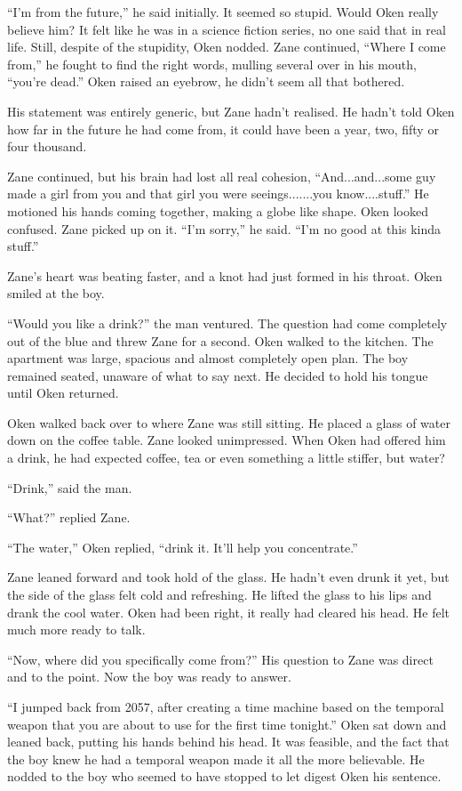 ``I'm from the future,'' he said initially.  It seemed so stupid.  Would Oken really believe him?  It felt like he was in a science fiction series, no one said that in real life.  Still, despite of the stupidity, Oken nodded.  Zane continued, ``Where I come from,'' he fought to find the right words, mulling several over in his mouth, ``you're dead.''  Oken raised an eyebrow, he didn't seem all that bothered.

His statement was entirely generic, but Zane hadn't realised.  He hadn't told Oken how far in the future he had come from, it could have been a year, two, fifty or four thousand.  

Zane continued, but his brain had lost all real cohesion, ``And...and...some guy made a girl from you and that girl you were seeings.......you know....stuff.''  He motioned his hands coming together, making a globe like shape.  Oken looked confused.  Zane picked up on it.  ``I'm sorry,'' he said.  ``I'm no good at this kinda stuff.''

Zane's heart was beating faster, and a knot had just formed in his throat.  Oken smiled at the boy.  

``Would you like a drink?'' the man ventured.  The question had come completely out of the blue and threw Zane for a second.  Oken walked to the kitchen.  The apartment was large, spacious and almost completely open plan.  The boy remained seated, unaware of what to say next.  He decided to hold his tongue until Oken returned.

Oken walked back over to where Zane was still sitting.  He placed a glass of water down on the coffee table.  Zane looked unimpressed.  When Oken had offered him a drink, he had expected coffee, tea or even something a little stiffer, but water?

``Drink,'' said the man.

``What?'' replied Zane.

``The water,'' Oken replied, ``drink it.  It'll help you concentrate.''

Zane leaned forward and took hold of the glass.  He hadn't even drunk it yet, but the side of the glass felt cold and refreshing.  He lifted the glass to his lips and drank the cool water.  Oken had been right, it really had cleared his head.  He felt much more ready to talk.

``Now, where did you specifically come from?''  His question to Zane was direct and to the point.  Now the boy was ready to answer.  

``I jumped back from 2057, after creating a time machine based on the temporal weapon that you are about to use for the first time tonight.''  Oken sat down and leaned back, putting his hands behind his head.  It was feasible, and the fact that the boy knew he had a temporal weapon made it all the more believable.  He nodded to the boy who seemed to have stopped to let digest Oken his sentence.  

